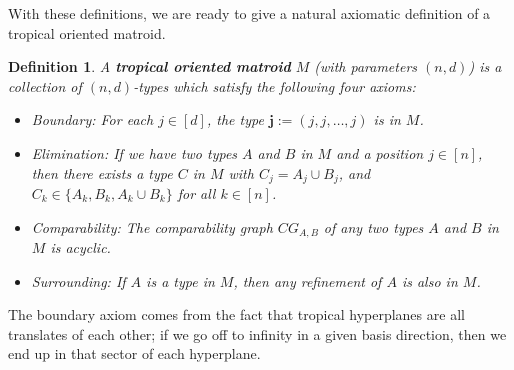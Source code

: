 \documentclass[11pt]{amsart}
\newtheorem{defn}[thm]{Definition}
\begin{document}

With these definitions, we are ready to give a natural axiomatic definition of a tropical oriented matroid.

\begin{defn}
A \textbf{tropical oriented matroid} $M$ (with parameters $(n, d)$) is a collection of 
$(n, d)$-types which satisfy the following four axioms:
\begin{itemize}
\item Boundary: For each $j\in [d]$, the type $\textbf{j} := (j,j, \ldots,j)$ is in $M$.


\item Elimination: If we have two types $A$ and $B$ in $M$ and a position $j\in 
[n]$, then there exists a type $C$ in $M$ with $C_j = A_j\cup B_j$, and $C_k \in \{A_k, B_k, A_k\cup B_k\}$ for all $k\in [n]$.

\item Comparability: The comparability graph $CG_{A,B}$ of any two types $A$ and $B$ in $M$ is acyclic.

\item Surrounding: If $A$ is a type in $M$, then any refinement of $A$ is also in $M$.

\end{itemize}
\end{defn}

The boundary axiom comes from the fact that tropical hyperplanes are all translates of each other; if we go off to infinity in a given basis direction, then we end up in that sector of each hyperplane. 
\end{document}
